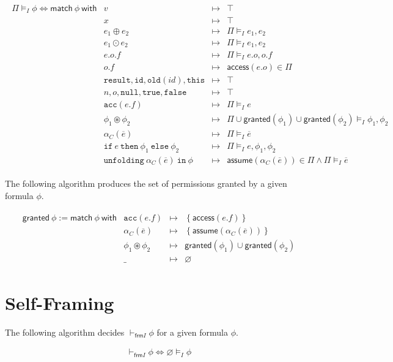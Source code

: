 \documentclass{article}
\newcommand{\tsf}{\textsf}
\newcommand{\tit}{\textit}
\newcommand{\ttt}{\texttt}
\newcommand{\access}{\tsf{access}}
\newcommand{\assume}{\tsf{assume}}
\newcommand{\frames}{\vDash_I}
\newcommand{\selfframes}{\vdash_{\tsf{frm}I}}
\newcommand{\mt}{\mapsto}
\newcommand{\set}[1]{\left\{ #1 \right\}}
\begin{document}
\begin{align*}
\begin{array}{r|lrl}
\Pi \frames \phi \iff \tsf{match} \ \phi \ \tsf{with}
& v &\mt& \top \\
& x &\mt& \top \\
& e_1 \oplus e_2 &\mt& \Pi \frames e_1, e_2 \\
& e_1 \odot e_2 &\mt& \Pi \frames e_1, e_2 \\
& e.o.f &\mt& \Pi \frames e.o, o.f \\
& o.f &\mt& \access(e.o) \in \Pi \\
& \ttt{result}, \ttt{id}, \ttt{old}(\tit{id}), \ttt{this} &\mt& \top \\
& n, o, \ttt{null}, \ttt{true}, \ttt{false} &\mt& \top \\
& \ttt{acc}(e.f) &\mt& \Pi \frames e \\
& \phi_1 \circledast \phi_2 &\mt& \Pi \cup \tsf{granted}(\phi_1) \cup \tsf{granted}(\phi_2) \frames \phi_1, \phi_2 \\
& \alpha_C(\overline{e}) &\mt& \Pi \frames \overline{e} \\
& \ttt{if} \ e \ \ttt{then} \ \phi_1 \ \ttt{else} \ \phi_2 &\mt& \Pi \frames e, \phi_1, \phi_2 \\
& \ttt{unfolding} \ \alpha_C(\overline{e}) \ \ttt{in} \ \phi &\mt& \assume(\alpha_C(\overline{e})) \in \Pi \land \Pi \frames \overline{e}
\end{array}
\end{align*}

The following algorithm produces the set of permissions granted by a given formula $\phi$.

\begin{align*}
\begin{array}{r|lrl}
\tsf{granted} \ \phi := \tsf{match} \ \phi \ \tsf{with}
& \ttt{acc}(e.f) &\mt& \set{ \access(e.f) } \\
& \alpha_C(\overline{e}) &\mt& \set{ \assume(\alpha_C(\overline{e})) } \\
& \phi_1 \circledast \phi_2 &\mt& \tsf{granted}(\phi_1) \cup \tsf{granted}(\phi_2) \\
& \_ &\mt& \varnothing
\end{array}
\end{align*}

\section{Self-Framing}

The following algorithm decides $\selfframes \phi$ for a given formula $\phi$.

\begin{align*}
\selfframes \phi \iff \varnothing \frames \phi
\end{align*}
\end{document}
